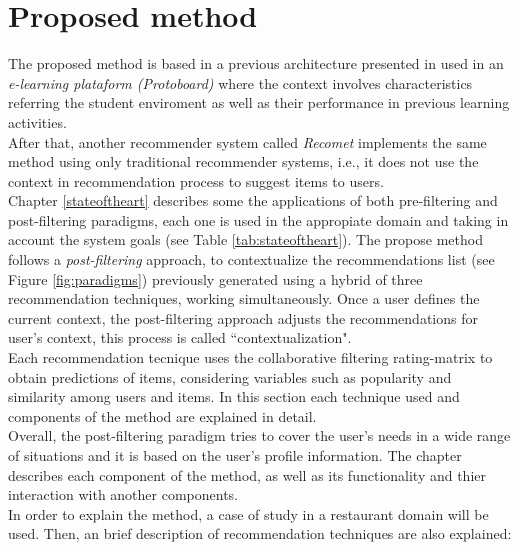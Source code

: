 \chapter{Proposed method}\label{method}

The proposed method is based  in a previous architecture presented in
 \cite{garcia2009hybrid} used in an \textit{e-learning plataform (Protoboard)}
where the context  involves characteristics referring the student
enviroment as well as their performance in previous learning activities.  \\ 
After that, another recommender system called \textit{Recomet}  
 \cite{ramirez2013restaurant} implements the same method using 
only traditional recommender systems, i.e., it does not use the context 
in recommendation process  to suggest items to users.   \\ 
Chapter  \ref{stateoftheart} describes some the applications of both pre-filtering and 
post-filtering paradigms, each one is used in the appropiate domain 
and taking in account the system goals (see Table  \ref{tab:stateoftheart}).  
The propose method follows a \textit{post-filtering} approach, 
to contextualize the recommendations list
(see Figure  \ref{fig:paradigms}) previously generated using a hybrid
of three recommendation techniques, working simultaneously.
Once a user defines the current context, the post-filtering approach
adjusts the  recommendations for user's context, this process is called
``contextualization". \\ 
Each recommendation tecnique uses the collaborative filtering rating-matrix 
to obtain  predictions of items, considering variables such as
popularity and similarity among users and items. In this section
each technique used and components of the method are explained in
detail.\\  Overall, the 
post-filtering paradigm tries to cover the  user's needs in a wide range of
situations and it is based on the user's profile information. The
chapter describes  each component of the  method, as well as its
functionality and thier interaction with  another components.\\ 
In order to explain the method, a case of study in a
restaurant   domain will be used. Then, an brief description of
recommendation  techniques are also explained: 
